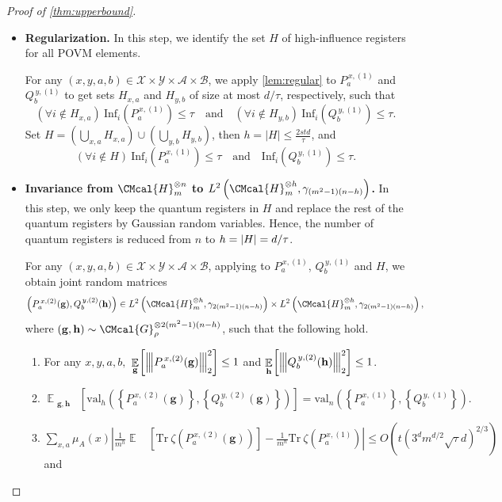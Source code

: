 \documentclass[11pt]{article}
\def\G{\CMcal{G}}
\def\H{\CMcal{H}}
\theoremstyle{plain}
\theoremstyle{definition}
\newcommand {\minusspace} {\: \! \!}
\newcommand {\Fn} [2] {\ensuremath{ #1 \minusspace \Br{ #2 } }}
\newcommand {\set} [1] {\ensuremath{ \left\lbrace #1 \right\rbrace }}
\newcommand {\br} [1] {\ensuremath{ \left( #1 \right) }}
\newcommand {\Br} [1] {\ensuremath{ \left[ #1 \right] }}
\newcommand {\ab} [1] {\ensuremath{ \left| #1 \right| }}
\DeclarePairedDelimiter{\abs}{\lvert}{\rvert}
\DeclareMathOperator*{\bigE}{\mathbb{E}}
\newcommand {\expec} [2] {\Fn{\bigE_{\substack{#1}}}{#2}}
\newcommand{\nnorm}[1]{{\left\vert\kern-0.25ex\left\vert\kern-0.25ex\left\vert #1
		\right\vert\kern-0.25ex\right\vert\kern-0.25ex\right\vert}}
\newcommand {\Tr} {\ensuremath{ \mathrm{Tr} }}
\newcommand {\id} {\ensuremath{\mathds{1}}}
\newcommand{\randg}{\ensuremath{\mathbf{g}}}
\newcommand{\randh}{\ensuremath{\mathbf{h}}}
\newcommand{\herspace}[1]{\ensuremath{\H_m^{\otimes #1}}}
\newcommand{\infi}[1]{\ensuremath{\mathrm{Inf}_i}\br{#1}}
\newcommand{\gval}[3]{\ensuremath{\mathrm{val}_{#1}\br{\set{#2},\set{#3}}}}
\newcommand{\fourtuples}{\ensuremath{\br{x,y,a,b}\in\calX\times\calY\times\calA\times\calB}}
\newcommand{\Pnn}[1] {\ensuremath{{P^{\,x, (#1)}_a}}}
\newcommand{\Qnn}[1] {\ensuremath{{Q^{\,y, (#1)}_b}}}
\newcommand{\calX}{\mathcal{X}}
\newcommand{\calY}{\mathcal{Y}}
\newcommand{\calA}{\mathcal{A}}
\newcommand{\calB}{\mathcal{B}}
\newcommand{\1}{\mathbb{1}} %
\begin{document}
\begin{proof}[Proof of \cref{thm:upperbound}]
\begin{itemize}
     \begin{enumerate}
						\item For any $x,y,a,b$, $\Pnn{1}$ and $\Qnn{1}$ are of degree at most $d$.
\item For any $x,y,a,b$, $\displaystyle\nnorm{\Pnn{1}}_2\leq1~\mbox{and}~\nnorm{\Qnn{1}}_2\leq1.$
			\item $\ab{\gval{n}{\Pnn{1}}{\Qnn{1}}-\gval{n}{\Pnn{0}}{\Qnn{0}}}\leq\delta t^2,$
\item $\displaystyle\frac{1}{m^n}\sum_{x,a}\mu_A(x)\Tr~\zeta\br{\Pnn{1}}\leq\delta t $ and $\displaystyle\frac{1}{m^n}\sum_{y,b}\mu_B(y)\Tr~\zeta\br{\Qnn{1}}\leq\delta t. $
            \item For any $x,y$, $\displaystyle\sum_{a\in\calA}\Pnn{1}=\sum_{b\in\calB}\Qnn{1}=\id$.
		\end{enumerate}
     
\item \textbf{Regularization.}
In this step, we identify the set $H$ of high-influence registers for all POVM elements.

      For any \fourtuples, we apply \cref{lem:regular} to $\Pnn{1}$ and $\Qnn{1}$ to get sets $H_{x,a}$ and $H_{y,b}$ of size at most $d/\tau$, respectively, such that 
      \[\br{\forall i\notin H_{x,a}}~\infi{\Pnn{1}}\leq\tau\quad\mbox{and}\quad\br{\forall i\notin H_{y,b}}~\infi{\Qnn{1}}\leq\tau.\]
      Set $H=\br{\bigcup_{x,a}H_{x,a}}\cup\br{\bigcup_{y,b}H_{y,b}}$, then 
      $h=\ab{H}\leq\frac{2std}{\tau}$, and 
      \[\br{\forall i\notin H}~\infi{\Pnn{1}}\leq\tau\quad\mbox{and}\quad\infi{\Qnn{1}}\leq\tau.\]
      
\item \textbf{Invariance from \herspace{n} to $L^2\br{\herspace{h},\gamma_{(m^2-1)(n-h)}}$.}
In this step, we only keep the quantum registers in $H$ and replace 
the rest of the quantum registers by Gaussian random variables.
Hence, 
the number of quantum registers is reduced from $n$ to $h = \abs{H} = d/\tau$.


      For any \fourtuples, applying \cite[Lemma 10.5]{qin2021nonlocal} to $\Pnn{1}$, $\Qnn{1}$ and $H$, we obtain joint random matrices
      \[\br{\Pnn{2}(\randg),\Qnn{2}(\randh)}\in L^2\br{\herspace{h},\gamma_{2(m^2-1)(n-h)}}\times L^2\br{\herspace{h},\gamma_{2(m^2-1)(n-h)}},\]
      where $\br{\mathbf{g},\mathbf{h}}\sim\G_{\rho}^{\otimes2(m^2-1)(n-h)}$, such that the following hold.
      \begin{enumerate}
		\item For any $x,y,a,b,$ $\displaystyle\expec{\randg}{\nnorm{\Pnn{2}(\randg)}_2^2}\leq1$ and 		
		$\displaystyle\expec{\randh}{\nnorm{\Qnn{2}(\randh)}_2^2}\leq1$.
		\item $\expec{\randg,\randh}{\gval{h}{\Pnn{2}(\randg)}{\Qnn{2}(\randg)}}=\gval{n}{\Pnn{1}}{\Qnn{1}}.$
		\item $\displaystyle\sum_{x,a}\mu_A(x)\ab{\frac{1}{m^h}\expec{}{\Tr~\zeta\br{\Pnn{2}(\randg)}}-\frac{1}{m^n}\Tr~\zeta\br{\Pnn{1}}}\leq O\br{t\br{3^dm^{d/2}\sqrt{\tau}d}^{2/3}}$ and


\end{enumerate}
\end{itemize}
\end{proof}
\end{document}
